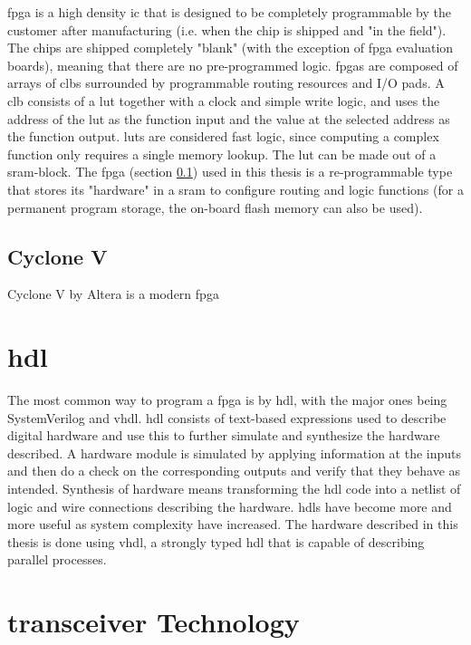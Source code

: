 \documentclass[main.tex]{subfiles}
\begin{document}
\Gls{fpga} is a high density \gls{ic} that is designed to be completely programmable by the customer after manufacturing (i.e. when the chip is shipped and "in the field"). The chips are shipped completely "blank" (with the exception of \gls{fpga} evaluation boards), meaning that there are no pre-programmed logic. \Glspl{fpga} are composed of arrays of \glspl{clb} surrounded by programmable routing resources and I/O pads. A \gls{clb} consists of a \gls{lut} together with a clock and simple write logic, and uses the address of the \gls{lut} as the function input and the value at the selected address as the function output. \glspl{lut} are considered fast logic, since computing a complex function only requires a single memory lookup. The \gls{lut} can be made out of a \gls{sram}-block. \cite{weste11} 
The \gls{fpga} (section \ref{sec:cyclone}) used in this thesis is a re-programmable type that stores its "hardware" in a \gls{sram} to configure routing and logic functions (for a permanent program storage, the on-board \gls{flash} memory can also be used).

\subsection{Cyclone V} \label{sec:cyclone}
Cyclone V by Altera is a modern \gls{fpga} 

\section{\gls{hdl}}
The most common way to program a \gls{fpga} is by \gls{hdl}, with the major ones being SystemVerilog and \acrshort{vhdl}. \Gls{hdl} consists of text-based expressions used to describe digital hardware and use this to further simulate and synthesize the hardware described. A hardware module is simulated by applying information at the inputs and then do a check on the corresponding outputs and verify that they behave as intended. Synthesis of hardware means transforming the \gls{hdl} code into a netlist of logic and wire connections describing the hardware. \glspl{hdl} have become more and more useful as system complexity have increased. \cite{weste11} The hardware described in this thesis is done using \acrshort{vhdl}, a strongly typed \gls{hdl} that is capable of describing parallel processes. 


\section{\Gls{transceiver} Technology}
\end{document}
